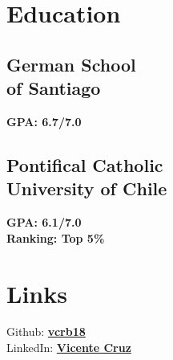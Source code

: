 \documentclass[]{deedy-resume-openfont}
\begin{document}
%
%
\lastupdated

%
%

%
%

\begin{minipage}[t]{0.33\textwidth} 


\section{Education} 

\subsection{German School \\ of Santiago}
\textbf{GPA: 6.7/7.0}
\sectionsep

\subsection{Pontifical Catholic \\ University of Chile}
\textbf{GPA: 6.1/7.0} \\
\textbf{Ranking: Top 5\%}
\sectionsep


\section{Links} 
Github: \href{https://github.com/vcrb18?tab=overview&from=2022-05-01&to=2022-05-31}{\bf vcrb18} \\
LinkedIn:  \href{https://www.linkedin.com/in/vicente-cruz-866135220/}{\bf Vicente Cruz} \\
\sectionsep


\end{minipage}
\end{document}
